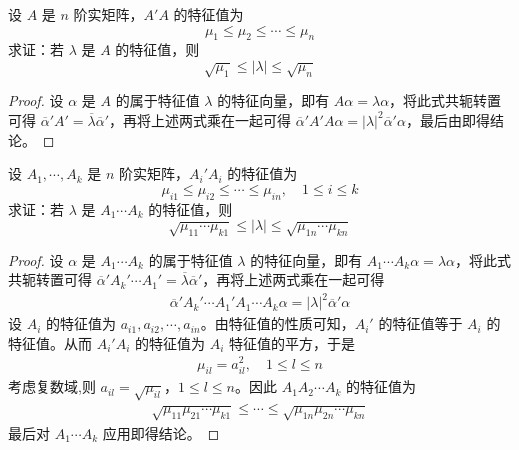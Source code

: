 \documentclass[../../main.tex]{subfiles}
\begin{document}
\begin{example}\label{example:例9.55}
设 \(A\) 是 \(n\) 阶实矩阵，\(A'A\) 的特征值为
\[
\mu_1 \leqslant  \mu_2 \leqslant  \cdots \leqslant  \mu_n
\]
求证：若 \(\lambda\) 是 \(A\) 的特征值，则
\[
\sqrt{\mu_1} \leqslant  |\lambda| \leqslant  \sqrt{\mu_n}
\]
\end{example}
\begin{proof}
设 \(\alpha\) 是 \(A\) 的属于特征值 \(\lambda\) 的特征向量，即有 \(A\alpha = \lambda\alpha\)，将此式共轭转置可得 \(\overline{\alpha}'A' = \overline{\lambda}\overline{\alpha}'\)，再将上述两式乘在一起可得 \(\overline{\alpha}'A'A\alpha = |\lambda|^2\overline{\alpha}'\alpha\)，最后由即得结论。 
\end{proof}

\begin{example}\label{example:例9.56}
设 \(A_1,\cdots,A_k\) 是 \(n\) 阶实矩阵，\(A_i'A_i\) 的特征值为
\[
\mu_{i1} \leqslant  \mu_{i2} \leqslant  \cdots \leqslant  \mu_{in},\quad 1\leqslant  i \leqslant  k
\]
求证：若 \(\lambda\) 是 \(A_1\cdots A_k\) 的特征值，则
\[
\sqrt{\mu_{11}\cdots\mu_{k1}} \leqslant  |\lambda| \leqslant  \sqrt{\mu_{1n}\cdots\mu_{kn}}
\]
\end{example}
\begin{proof}
设 \(\alpha\) 是 \(A_1\cdots A_k\) 的属于特征值 \(\lambda\) 的特征向量，即有 \(A_1\cdots A_k\alpha = \lambda\alpha\)，将此式共轭转置可得 \(\overline{\alpha}'A_k'\cdots A_1' = \overline{\lambda}\overline{\alpha}'\)，再将上述两式乘在一起可得
\begin{align*}
\overline{\alpha}'A_k'\cdots A_1'A_1\cdots A_k\alpha = |\lambda|^2\overline{\alpha}'\alpha
\end{align*}
设 \(A_i\) 的特征值为 \(a_{i1},a_{i2},\cdots,a_{in}\)。由特征值的性质可知，\(A_i'\) 的特征值等于 \(A_i\) 的特征值。从而 \(A_i'A_i\) 的特征值为 \(A_i\) 特征值的平方，于是
\begin{align*}
\mu_{il} = a_{il}^2,\quad 1\leqslant  l \leqslant  n
\end{align*}
考虑复数域,则 \(a_{il} = \sqrt{\mu_{il}}\)，\(1\leqslant  l \leqslant  n\)。因此 \(A_1A_2\cdots A_k\) 的特征值为
\begin{align*}
\sqrt{\mu_{11}\mu_{21}\cdots\mu_{k1}} \leqslant  \cdots \leqslant  \sqrt{\mu_{1n}\mu_{2n}\cdots\mu_{kn}}
\end{align*}
最后对 \(A_1\cdots A_k\) 应用即得结论。 
\end{proof}
\end{document}
